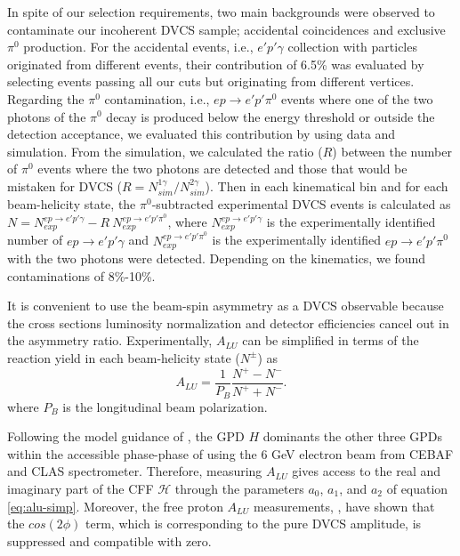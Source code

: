 \documentclass[twocolumn,nofootinbib,showpacs,prl,superscriptaddress,secnumarabic,amssymb,nobibnotes,aps,floatfix]{revtex4}
\begin{document}
In spite of our selection requirements, two main backgrounds were observed to 
contaminate our incoherent DVCS sample; accidental coincidences and exclusive 
$\pi^0$ production. For the accidental events, i.e., $e'p'\gamma$ collection 
with particles originated from different events, their contribution of 6.5\% 
was evaluated by selecting events passing all our cuts but originating from 
different vertices. Regarding the $\pi^0$ contamination, i.e., $ep\rightarrow 
e'p'\pi^0$ events where one of the two photons of the $\pi^0$ decay is produced 
below the energy threshold or outside the detection acceptance, we evaluated 
this contribution by using data and simulation. From the simulation, we 
calculated the ratio ($R$) between the number of $\pi^0$ events where the two 
photons are detected and those that would be mistaken for DVCS ($R = 
N^{1\gamma}_{sim}/N^{2\gamma}_{sim}$). Then in each kinematical bin and for 
each beam-helicity state, the $\pi^0$-subtracted experimental DVCS events is 
calculated as $N = N^{ep\rightarrow e'p'\gamma}_{exp}- R~N^{ep\rightarrow 
e'p'\pi^0}_{exp}$, where $N^{ep\rightarrow e'p'\gamma}_{exp}$ is the 
experimentally identified number of $ep\rightarrow e'p'\gamma$ and 
$N^{ep\rightarrow e'p'\pi^0}_{exp}$ is the experimentally identified 
$ep\rightarrow e'p'\pi^0$ with the two photons were detected. Depending on the 
kinematics, we found contaminations of 8\%-10\%. 



It is convenient to use the beam-spin asymmetry as a DVCS observable because  
the cross sections luminosity normalization and detector efficiencies cancel 
out in the asymmetry ratio.  Experimentally, $A_{LU}$ can be simplified in 
terms of the reaction yield in each beam-helicity state ($N^{\pm}$) as
\begin{equation}
A_{LU} = \frac{1}{P_{B}} \frac{N^{+} - N^{-}}{N^{+} + N^{-} }.
\end{equation}
where $P_{B}$ is the longitudinal beam polarization.  

Following the model guidance of \cite{Guidal:2013rya}, the GPD $H$ dominants 
the other three GPDs within the accessible phase-phase of using the 6 GeV 
electron beam from CEBAF and CLAS spectrometer. Therefore, measuring $A_{LU}$ 
gives access to the real and imaginary part of the CFF $\mathcal{H}$ through 
the parameters $a_0$, $a_1$, and $a_2$ of equation \ref{eq:alu-simp}.  
Moreover, the free proton $A_{LU}$ measurements, \cite{Girod:2007aa}, have 
shown that the $cos(2\phi)$ term, which is corresponding to the pure DVCS 
amplitude, is suppressed and compatible with zero.  
\end{document}
